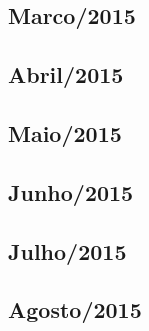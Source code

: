 \documentclass[12pt,a4paper]{article}
\begin{document}
\subsection{Marco/2015}
  
 
\subsection{Abril/2015}
  
  
\subsection{Maio/2015} 
  
  
  
   
\subsection{Junho/2015}
   
   
   
%   
%   

\subsection{Julho/2015}
    
     
    
    
     
    
    
\subsection{Agosto/2015}
   
   
   
%   
% 
%   
%   
%   
% 


\end{document}
